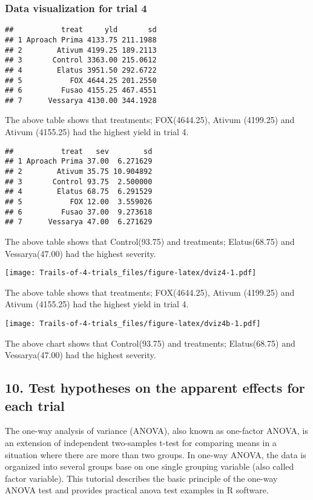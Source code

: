 \documentclass[
]{article}
\begin{document}
\hypertarget{data-visualization-for-trial-4}{%
\subsubsection{Data visualization for trial
4}\label{data-visualization-for-trial-4}}

\begin{verbatim}
##           treat     yld       sd
## 1 Aproach Prima 4133.75 211.1988
## 2        Ativum 4199.25 189.2113
## 3       Control 3363.00 215.0612
## 4        Elatus 3951.50 292.6722
## 5           FOX 4644.25 201.2550
## 6         Fusao 4155.25 467.4551
## 7      Vessarya 4130.00 344.1928
\end{verbatim}

The above table shows that treatments; FOX(4644.25), Ativum (4199.25)
and Ativum (4155.25) had the highest yield in trial 4.

\begin{verbatim}
##           treat   sev        sd
## 1 Aproach Prima 37.00  6.271629
## 2        Ativum 35.75 10.904892
## 3       Control 93.75  2.500000
## 4        Elatus 68.75  6.291529
## 5           FOX 12.00  3.559026
## 6         Fusao 37.00  9.273618
## 7      Vessarya 47.00  6.271629
\end{verbatim}

The above table shows that Control(93.75) and treatments; Elatus(68.75)
and Vessarya(47.00) had the highest severity.

\texttt{[image: Trails-of-4-trials\_files/figure-latex/dviz4-1.pdf]}

The above table shows that treatments; FOX(4644.25), Ativum (4199.25)
and Ativum (4155.25) had the highest yield in trial 4.

\texttt{[image: Trails-of-4-trials\_files/figure-latex/dviz4b-1.pdf]}

The above chart shows that Control(93.75) and treatments; Elatus(68.75)
and Vessarya(47.00) had the highest severity.

\hypertarget{test-hypotheses-on-the-apparent-effects-for-each-trial}{%
\subsection{10. Test hypotheses on the apparent effects for each
trial}\label{test-hypotheses-on-the-apparent-effects-for-each-trial}}

The one-way analysis of variance (ANOVA), also known as one-factor
ANOVA, is an extension of independent two-samples t-test for comparing
means in a situation where there are more than two groups. In one-way
ANOVA, the data is organized into several groups base on one single
grouping variable (also called factor variable). This tutorial describes
the basic principle of the one-way ANOVA test and provides practical
anova test examples in R software.
\end{document}
